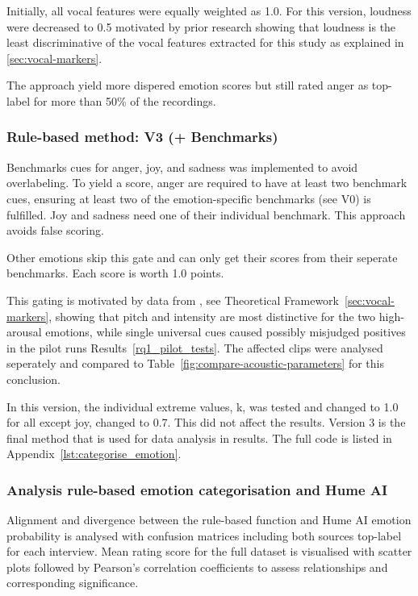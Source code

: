 Initially, all vocal features were equally weighted as 1.0. For this version, loudness were decreased to 0.5 motivated by prior research showing that loudness is the 
least discriminative of the vocal features extracted for this study as explained in \ref{sec:vocal-markers}. 

The approach yield more dispered emotion scores but still rated anger as top-label for more than 50\% of the recordings. 

\subsubsection{Rule-based method: V3 (+ Benchmarks)}
Benchmarks cues for anger, joy, and sadness was implemented to avoid overlabeling. To yield a score, anger are required to have at least two benchmark cues, ensuring at least two of the emotion-specific benchmarks (see V0) is fulfilled.  
Joy and sadness need one of their individual benchmark. This approach avoids false scoring. 

Other emotions skip this gate and can only get their scores from their seperate benchmarks. Each score is worth 1.0 points. 

This gating is motivated by data from \textcite{Ekberg2023}, see Theoretical Framework~\ref{sec:vocal-markers}, showing that pitch and intensity are most distinctive for 
the two high-arousal emotions, while single universal cues caused possibly misjudged positives in the pilot runs Results~\ref{rq1_pilot_tests}. The affected clips were analysed seperately and compared to Table~\ref{fig:compare-acoustic-parameters} for this conclusion. 

In this version, the individual extreme values, k, was tested and changed to 1.0 for all except joy, changed to 0.7. This did not affect the results. 
Version 3 is the final method that is used for data analysis in results. The full code is listed in Appendix~\ref{lst:categorise_emotion}.

\subsubsection{Analysis rule-based emotion categorisation and Hume AI}
Alignment and divergence between the rule-based function and Hume AI emotion probability is analysed with confusion matrices including both sources top-label for each interview. 
Mean rating score for the full dataset is visualised with scatter plots followed by Pearson's correlation coefficients to assess relationships and corresponding significance. 

